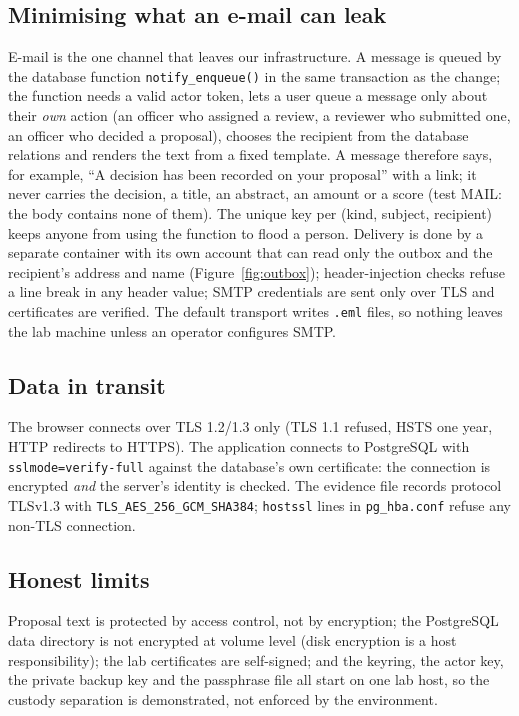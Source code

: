 \documentclass[10pt,a4paper]{article}
\newcommand{\code}[1]{\nolinkurl{#1}}
\begin{document}
\subsection{Minimising what an e-mail can leak}
E-mail is the one channel that leaves our infrastructure. A message is queued by the database function \code{notify\_enqueue()} in the same transaction as the change; the function needs a valid actor token, lets a user queue a message only about their \emph{own} action (an officer who assigned a review, a reviewer who submitted one, an officer who decided a proposal), chooses the recipient from the database relations and renders the text from a fixed template. A message therefore says, for example, ``A decision has been recorded on your proposal'' with a link; it never carries the decision, a title, an abstract, an amount or a score (test MAIL: the body contains none of them). The unique key per (kind, subject, recipient) keeps anyone from using the function to flood a person. Delivery is done by a separate container with its own account that can read only the outbox and the recipient's address and name (Figure~\ref{fig:outbox}); header-injection checks refuse a line break in any header value; SMTP credentials are sent only over TLS and certificates are verified. The default transport writes \code{.eml} files, so nothing leaves the lab machine unless an operator configures SMTP.

\subsection{Data in transit}
The browser connects over TLS 1.2/1.3 only (TLS 1.1 refused, HSTS one year, HTTP redirects to HTTPS). The application connects to PostgreSQL with \code{sslmode=verify-full} against the database's own certificate: the connection is encrypted \emph{and} the server's identity is checked. The evidence file records protocol TLSv1.3 with \code{TLS\_AES\_256\_GCM\_SHA384}; \code{hostssl} lines in \code{pg_hba.conf} refuse any non-TLS connection.

\subsection{Honest limits}
Proposal text is protected by access control, not by encryption; the PostgreSQL data directory is not encrypted at volume level (disk encryption is a host responsibility); the lab certificates are self-signed; and the keyring, the actor key, the private backup key and the passphrase file all start on one lab host, so the custody separation is demonstrated, not enforced by the environment.
\end{document}
